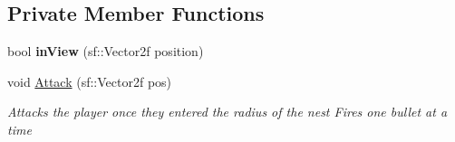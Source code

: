\subsection*{Private Member Functions}
\begin{DoxyCompactItemize}
\item 
\mbox{\label{class_nests_a0c7331f3aad39acda6c56b93a9e2acdf}} 
bool {\bfseries in\+View} (sf\+::\+Vector2f position)
\item 
void \mbox{\hyperlink{class_nests_a288c3f8242ce492434df30d8204c10ca}{Attack}} (sf\+::\+Vector2f pos)
\begin{DoxyCompactList}\small\item\em Attacks the player once they entered the radius of the nest Fires one bullet at a time \end{DoxyCompactList}\end{DoxyCompactItemize}
